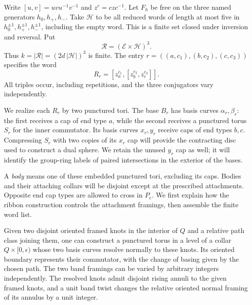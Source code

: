 Write $[u,v]=uvu^{-1}v^{-1}$ and $z^c=czc^{-1}$.  Let $F_h$ be
free on the three named generators $h_0,h_+,h_-$.  Take $\mathcal H$
to be all reduced words of length at most five in
$h_0^{\pm1},h_+^{\pm1},h_-^{\pm1}$, including the empty word.
This is a finite set closed under inversion and reversal.  Put
\[
                  \mathcal R=(\mathcal E\times\mathcal H)^3.
\]
Thus $k=|\mathcal R|=(2d\,|\mathcal H|)^3$ is finite.  The entry
$r=((a,c_1),(b,c_2),(c,c_3))$ specifies the word
\begin{equation}\label{geo:relations}
 R_r=[z_a^{c_1},[z_b^{c_2},z_c^{c_3}]].
\end{equation}
All triples occur, including repetitions, and the three conjugators vary
independently.

We realize each $R_r$ by two punctured tori.  The base $B_r$ has
basis curves $\alpha_r,\beta_r$: the first receives a cap of end type
$a$, while the second receives a punctured torus $S_r$ for the inner
commutator.  Its basis curves $x_r,y_r$ receive caps of end types $b,c$.
Compressing $S_r$ with two copies of its $x_r$ cap will provide the
contracting disc used to construct a dual sphere.  We retain the unused
$y_r$ cap as well; it will identify the group-ring labels of paired
intersections in the exterior of the bases.

A \emph{body} means one of these embedded punctured tori, excluding its
caps.  Bodies and their attaching collars will be disjoint except at
the prescribed attachments.  Opposite end cap types are allowed to
cross in $P_e$.  We first explain how the ribbon construction controls
the attachment framings, then assemble the finite word list.

\begin{lemma}\label{geo:framing}
Given two disjoint oriented framed knots in the interior of $Q$ and a
relative path class joining them, one can construct a punctured torus
in a level of a collar $Q\times[0,\epsilon)$ whose two basis curves
resolve normally to these knots.  Its oriented boundary represents
their commutator, with the change of basing given by the chosen path.
The two band framings can be varied by arbitrary integers independently.
The resolved knots admit disjoint rising annuli to the given framed
knots, and a unit band twist changes the relative oriented normal
framing of its annulus by a unit integer.
\end{lemma}

